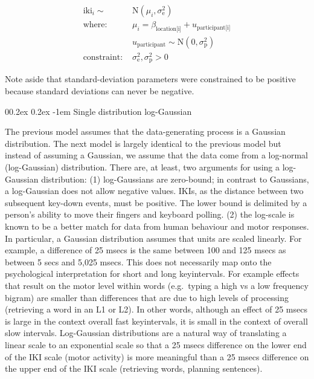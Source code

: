 \documentclass[
  english,
  man,floatsintext]{apa7}
\makeatletter
\let\oldparagraph\paragraph
\renewcommand{\paragraph}[1]{\oldparagraph{#1}\mbox{}}
\renewcommand{\paragraph}{\@startsection{paragraph}{4}{\parindent}%
  {0\baselineskip \@plus 0.2ex \@minus 0.2ex}%
  {-1em}%
  {\normalfont\normalsize\bfseries\itshape\typesectitle}}
\makeatother
\begin{document}
\begin{appendix}
\begin{equation}
\begin{aligned}
\label{eq:unimodgaus}
\text{iki}_i \sim\text{ } & \text{N}(\mu_i, \sigma_\text{e}^2)\\
\text{where: } & \mu_i = \beta_\text{location[i]} + u_\text{participant[i]}\\
& u_\text{participant} \sim \text{N}(0, \sigma_\text{p}^2)\\
\text{constraint: } & \sigma_\text{e}^2, \sigma_\text{p}^2>0
\end{aligned}
\end{equation}

Note aside that standard-deviation parameters were constrained to be
positive because standard deviations can never be negative.

\hypertarget{single-distribution-log-gaussian}{%
\paragraph{Single distribution
log-Gaussian}\label{single-distribution-log-gaussian}}

The previous model assumes that the data-generating process is a
Gaussian distribution. The next model is largely identical to the
previous model but instead of assuming a Gaussian, we assume that the
data come from a log-normal (log-Gaussian) distribution. There are, at
least, two arguments for using a log-Gaussian distribution: (1)
log-Gaussians are zero-bound; in contrast to Gaussians, a log-Gaussian
does not allow negative values. IKIs, as the distance between two
subsequent key-down events, must be positive. The lower bound is
delimited by a person's ability to move their fingers and keyboard
polling. (2) the log-scale is known to be a better match for data from
human behaviour and motor responses. In particular, a Gaussian
distribution assumes that units are scaled linearly. For example, a
difference of 25 msecs is the same between 100 and 125 msecs as between
5 secs and 5,025 msecs. This does not necessarily map onto the
psychological interpretation for short and long keyintervals. For
example effects that result on the motor level within words (e.g.~typing
a high vs a low frequency bigram) are smaller than differences that are
due to high levels of processing (retrieving a word in an L1 or L2). In
other words, although an effect of 25 msecs is large in the context
overall fast keyintervals, it is small in the context of overall slow
intervals. Log-Gaussian distributions are a natural way of translating a
linear scale to an exponential scale so that a 25 msecs difference on
the lower end of the IKI scale (motor activity) is more meaningful than
a 25 msecs difference on the upper end of the IKI scale (retrieving
words, planning sentences).


\end{appendix}
\end{document}
